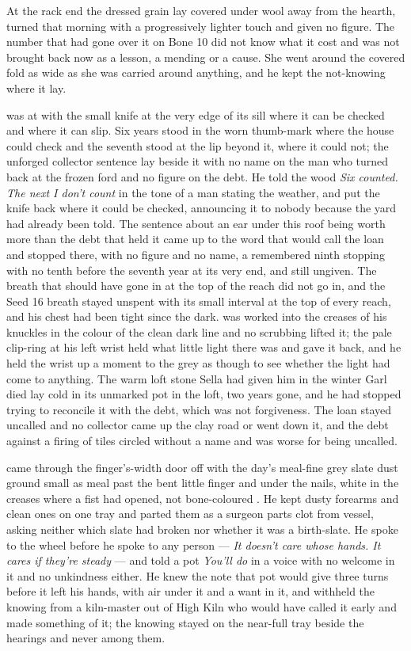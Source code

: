 At the rack end the dressed grain lay covered under wool away from the hearth, turned that morning with a progressively lighter touch and given no figure. The number that had gone over it on Bone 10 did not know what it cost and was not brought back now as a lesson, a mending or a cause. She went around the covered fold as wide as she was carried around anything, and he kept the not-knowing where it lay.

\scenebreak

 was at  with the small knife at the very edge of its sill where it can be checked and where it can slip. Six years stood in the worn thumb-mark where the house could check and the seventh stood at the lip beyond it, where it could not; the unforged collector sentence lay beside it with no name on the man who turned back at the frozen ford and no figure on the debt. He told the wood \emph{Six counted. The next I don't count} in the tone of a man stating the weather, and put the knife back where it could be checked, announcing it to nobody because the yard had already been told. The sentence about an ear under this roof being worth more than the debt that held it came up to the word that would call the loan and stopped there, with no figure and no name, a remembered ninth stopping with no tenth before the seventh year at its very end, and still ungiven. The breath that should have gone in at the top of the reach did not go in, and the Seed 16 breath stayed unspent with its small interval at the top of every reach, and his chest had been tight since the dark.  was worked into the creases of his knuckles in the colour of the clean dark line and no scrubbing lifted it; the pale clip-ring at his left wrist held what little light there was and gave it back, and he held the wrist up a moment to the grey as though to see whether the light had come to anything. The warm loft stone Sella had given him in the winter Garl died lay cold in its unmarked pot in the loft, two years gone, and he had stopped trying to reconcile it with the debt, which was not forgiveness. The loan stayed uncalled and no collector came up the clay road or went down it, and the debt against a firing of tiles circled without a name and was worse for being uncalled.

 came through the finger's-width door off  with the day's meal-fine grey slate dust ground small as meal past the bent little finger and under the nails, white in the creases where a fist had opened, not bone-coloured . He kept dusty forearms and clean ones on one tray and parted them as a surgeon parts clot from vessel, asking neither which slate had broken nor whether it was a birth-slate. He spoke to the wheel before he spoke to any person --- \emph{It doesn't care whose hands. It cares if they're steady} --- and told a pot \emph{You'll do} in a voice with no welcome in it and no unkindness either. He knew the note that pot would give three turns before it left his hands, with air under it and a want in it, and withheld the knowing from a kiln-master out of High Kiln who would have called it early and made something of it; the knowing stayed on the near-full tray beside the hearings and never among them.

